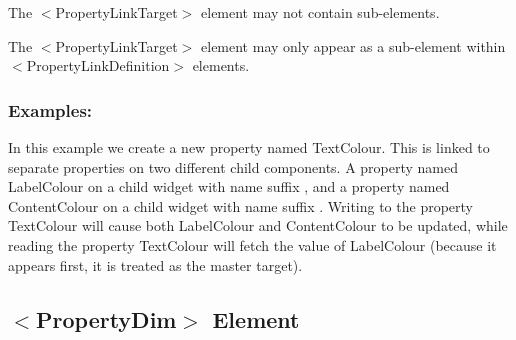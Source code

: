 \begin{DoxyItemize}
\item The {\ttfamily $<$Property\+Link\+Target$>$} element may not contain sub-\/elements. 
\item The {\ttfamily $<$Property\+Link\+Target$>$} element may only appear as a sub-\/element within {\ttfamily $<$Property\+Link\+Definition$>$} elements. 
\end{DoxyItemize}\hypertarget{fal_element_ref_fal_elem_propertylinktarget_4}{}\subsubsection{Examples\+:}\label{fal_element_ref_fal_elem_propertylinktarget_4}
In this example we create a new property named \textquotesingle{}Text\+Colour\textquotesingle{}. This is linked to separate properties on two different child components. A property named \textquotesingle{}Label\+Colour\textquotesingle{} on a child widget with name suffix \textquotesingle{}, and a property named \textquotesingle{}Content\+Colour\textquotesingle{} on a child widget with name suffix . Writing to the property \textquotesingle{}Text\+Colour\textquotesingle{} will cause both \textquotesingle{}Label\+Colour\textquotesingle{} and \textquotesingle{}Content\+Colour\textquotesingle{} to be updated, while reading the property \textquotesingle{}Text\+Colour\textquotesingle{} will fetch the value of \textquotesingle{}Label\+Colour\textquotesingle{} (because it appears first, it is treated as the master target). 
\begin{DoxyCode}{0}
\end{DoxyCode}
\hypertarget{fal_element_ref_fal_elem_ref_sec_28}{}\subsection{$<$\+Property\+Dim$>$ Element}\label{fal_element_ref_fal_elem_ref_sec_28}
